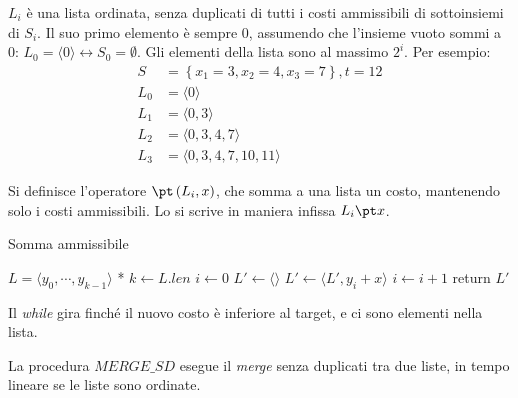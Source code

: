 \begin{definition}
    \label{def:listasenzaduplicati}
    $L_i$ è una lista ordinata, senza duplicati di tutti i costi ammissibili di sottoinsiemi di $S_i$.
    Il suo primo elemento è sempre 0, assumendo che l'insieme vuoto sommi a 0: $
    L_0 = \langle 0 \rangle
    \leftrightarrow
    S_0 = \emptyset
    $.
    Gli elementi della lista sono al massimo $2^i$.
    Per esempio:
    \begin{align*}
        S &= 
        \left\{ x_1 = 3, x_2 = 4, x_3 = 7 \right\}, t = 12
        \\
        L_0 &= \langle 0 \rangle
        \\
        L_1 &= \langle 0, 3 \rangle
        \\
        L_2 &= \langle 0, 3, 4, 7 \rangle
        \\
        L_3 &= \langle 0, 3, 4, 7, 10, 11 \rangle
    \end{align*}
\end{definition}
\begin{definition}
    \label{def:operatorept}
    Si definisce l'operatore $
    \pt \left( L_i, x \right)
    $, che somma a una lista un costo, mantenendo solo i costi ammissibili.
    Lo si scrive in maniera infissa $
    L_i \pt x
    $.
    \begin{algorithm}[H]
    \caption{Somma ammissibile}\label{alg:operatorept}
    \begin{algorithmic}[1]
            \State * $L = \langle y_0, \cdots, y_{k-1} \rangle $ *
            \State $k \gets L.len$
            \State $i \gets 0$
            \State $L' \gets \langle \rangle $
                \State $L' \gets \langle L', y_i + x \rangle $
                \State $i \gets i + 1$
            \EndWhile
            \State return $L'$
        \EndProcedure
    \end{algorithmic}
    \end{algorithm}
    Il \emph{while} gira finché il nuovo costo è inferiore al target, e ci sono elementi nella lista.
\end{definition}
\begin{definition}
    La procedura $MERGE\_SD$ esegue il \emph{merge} senza duplicati tra due liste, in tempo lineare se le liste sono ordinate.
    \label{def:mergesd}
\end{definition}

